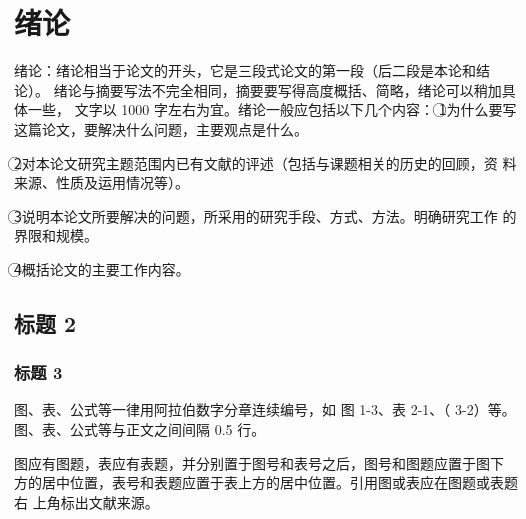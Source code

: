 \documentclass[]{template}
\begin{document}
\section{绪论}
绪论：绪论相当于论文的开头，它是三段式论文的第一段（后二段是本论和结论）。 绪论与摘要写法不完全相同，摘要要写得高度概括、简略，绪论可以稍加具体一些， 文字以 1000 字左右为宜。绪论一般应包括以下几个内容：
\textcircled{1}为什么要写这篇论文，要解决什么问题，主要观点是什么。

\textcircled{2}对本论文研究主题范围内已有文献的评述（包括与课题相关的历史的回顾，资 料来源、性质及运用情况等）。 

\textcircled{3}说明本论文所要解决的问题，所采用的研究手段、方式、方法。明确研究工作 的界限和规模。 

\textcircled{4}概括论文的主要工作内容。  
 
\subsection{标题 2}
\subsubsection{标题 3}
图、表、公式等一律用阿拉伯数字分章连续编号，如 图 1-3、表 2-1、（ 3-2）等。 图、表、公式等与正文之间间隔 0.5 行。 
 
图应有图题，表应有表题，并分别置于图号和表号之后，图号和图题应置于图下 方的居中位置，表号和表题应置于表上方的居中位置。引用图或表应在图题或表题右 上角标出文献来源。 
\end{document}
